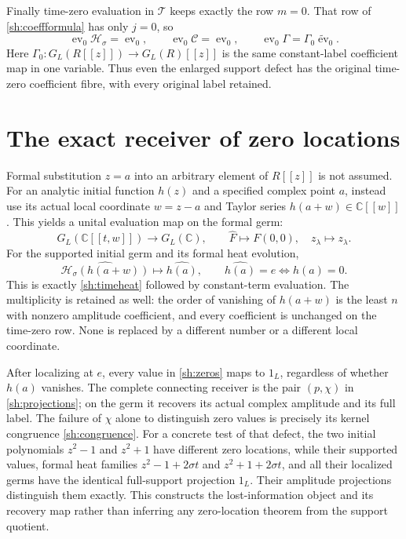 \documentclass[11pt,a4paper]{article}
\theoremstyle{definition}\newtheorem{definition}[theorem]{Definition}
\newcommand{\C}{\mathbb C}\newcommand{\R}{\mathbb R}
\providecommand{\Ht}{\mathcal H}
\begin{document}
Finally time-zero evaluation in $\mathscr T$ keeps exactly
the row $m=0$. That row of \eqref{sh:coeffformula} has only
$j=0$, so
\begin{equation}\tag{SH39}\label{sh:coefftimezero}
 \operatorname{ev}_0\mathscr H_\sigma
   =\operatorname{ev}_0,\qquad
 \operatorname{ev}_0\mathscr C=\operatorname{ev}_0,\qquad
 \operatorname{ev}_0\Gamma
   =\Gamma_0\widetilde{\operatorname{ev}}_0.
\end{equation}
Here $\Gamma_0:G_L(R[[z]])\to G_L(R)[[z]]$ is the
same constant-label coefficient map in one variable.
Thus even the enlarged support defect has the original
time-zero coefficient fibre, with every original label retained.

\section{The exact receiver of zero locations}

Formal substitution $z=a$ into an arbitrary element of $R[[z]]$
is not assumed. For an analytic initial function $h(z)$ and a
specified complex point $a$, instead use its actual local
coordinate $w=z-a$ and Taylor series
$h(a+w)\in\C[[w]]$. This yields a unital evaluation map
on the formal germ:
\begin{equation}\tag{SH40}\label{sh:zeroreceiver}
 G_L(\C[[t,w]])\longrightarrow G_L(\C),\qquad
 \widehat F\mapsto\widehat{F(0,0)},\quad
 z_\lambda\mapsto z_\lambda.
\end{equation}
For the supported initial germ and its formal heat evolution,
\begin{equation}\tag{SH41}\label{sh:zeros}
 \widehat{\Ht_\sigma(h(a+w))}\longmapsto\widehat{h(a)},\qquad
 \widehat{h(a)}=e\iff h(a)=0 .
\end{equation}
This is exactly \eqref{sh:timeheat} followed by constant-term
evaluation. The multiplicity is retained as well: the order of
vanishing of $h(a+w)$ is the least $n$ with nonzero amplitude
coefficient, and every coefficient is unchanged on the
time-zero row. None is replaced by a different number or a
different local coordinate.

After localizing at $e$, every value in \eqref{sh:zeros} maps
to $1_L$, regardless of whether $h(a)$ vanishes. The complete
connecting receiver is the pair $(p,\chi)$ in
\eqref{sh:projections}; on the germ it recovers its actual
complex amplitude and its full label. The failure of $\chi$
alone to distinguish zero values is precisely its kernel
congruence \eqref{sh:congruence}. For a concrete test of that
defect, the two initial polynomials $z^2-1$ and $z^2+1$ have
different zero locations, while their supported values, formal
heat families $z^2-1+2\sigma t$ and $z^2+1+2\sigma t$, and
all their localized germs have the identical full-support
projection $1_L$. Their amplitude projections distinguish them
exactly. This constructs the lost-information object and its
recovery map rather than inferring any zero-location theorem
from the support quotient.
\end{document}
